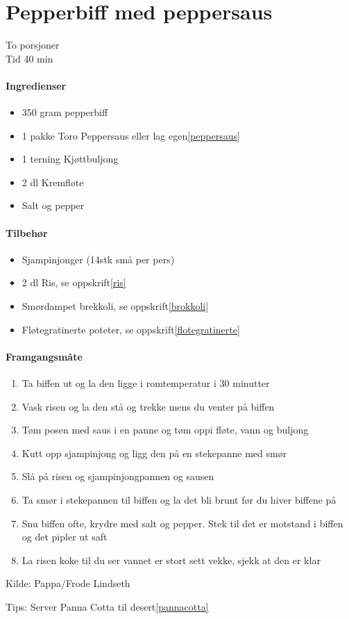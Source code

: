 \section{Pepperbiff med peppersaus}
To porsjoner\\
Tid 40 min

\paragraph{Ingredienser}
\begin{itemize}[noitemsep]
	\item 350 gram  pepperbiff
	\item 1 pakke Toro Peppersaus eller lag egen\ref{peppersaus}
	\item 1 terning Kjøttbuljong
	\item 2 dl Kremfløte
	\item Salt og pepper
\end{itemize}

\paragraph{Tilbehør}
\begin{itemize}[noitemsep]
	\item Sjampinjonger (14stk små per pers)
	\item 2 dl Ris, se oppskrift\ref{ris}
	\item Smørdampet brekkoli, se oppskrift\ref{brokkoli}
	\item Fløtegratinerte poteter, se oppskrift\ref{flotegratinerte}
\end{itemize}

\paragraph{Framgangsmåte}
\begin{enumerate}[noitemsep]
	\item Ta biffen ut og la den ligge i romtemperatur i 30 minutter
	\item Vask risen og la den stå og trekke mens du venter på biffen
	\item Tøm posen med saus i en panne og tøm oppi fløte, vann og buljong
	\item Kutt opp sjampinjong og ligg den på en stekepanne med smør
	\item Slå på risen og sjampinjongpannen og sausen
	\item Ta smør i stekepannen til biffen og la det bli brunt før du hiver biffene på
	\item Snu biffen ofte, krydre med salt og pepper. Stek til det er motstand i biffen og det pipler ut saft
	\item La risen koke til du ser vannet er stort sett vekke, sjekk at den er klar
\end{enumerate}

Kilde: Pappa/Frode Lindseth

Tips: Server Panna Cotta til desert\ref{pannacotta}
